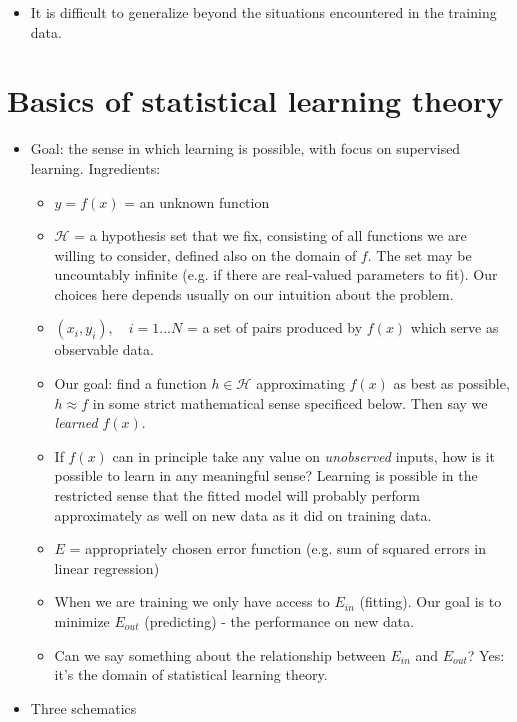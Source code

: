 \documentclass[norsk,a4paper,11pt]{article}
\begin{document}
\begin{itemize}
\begin{itemize}
\begin{itemize}
				\item It is difficult to generalize beyond the situations encountered in the training data.
			\end{itemize}
		\end{itemize}
	\end{itemize}
	
\section{Basics of statistical learning theory}
	\begin{itemize}
		\item Goal: the sense in which learning is possible, with focus on supervised learning. Ingredients:
		\begin{itemize}
			\item $y = f(x)$ = an unknown function
			\item $\mathcal{H}$ = a hypothesis set that we fix, consisting of all functions we are willing to consider, defined also on the domain of $f$. The set may be uncountably infinite (e.g. if there are real-valued parameters to fit). Our choices here depends usually on our intuition about the problem.
			\item $(x_i, y_i), \quad i=1...N$ = a set of pairs produced by $f(x)$ which serve as observable data. 
			\item Our goal: find a function $h \in \mathcal{H}$ approximating $f(x)$ as best as possible, $h \approx f$ in some strict mathematical sense specificed below. Then say we \textit{learned} $f(x)$.
			\item If $f(x)$ can in principle take any value on \textit{unobserved} inputs, how is it possible to learn in any meaningful sense? Learning is possible in the restricted sense that the fitted model will probably perform approximately as well on new data as it did on training data.
			\item $E$ = appropriately chosen error function (e.g. sum of squared errors in linear regression)
			\item When we are training we only have access to $E_{in}$ (fitting). Our goal is to minimize $E_{out}$ (predicting) - the performance on new data.
			\item Can we say something about the relationship between $E_{in}$ and $E_{out}$? Yes: it's the domain of statistical learning theory.
		\end{itemize}
		\item Three schematics
		\begin{itemize}

\end{itemize}
\end{itemize}
\end{document}
